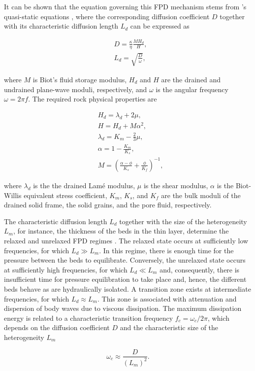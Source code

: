 \documentclass[draft]{agujournal2019}
\begin{document}
It can be shown that the equation governing this FPD mechanism stems from \citeauthor{Biot1941}'s \citeyear{Biot1941} quasi-static equations \cite{Dutta1979, Chandler1981, Norris1993}, where the corresponding diffusion coefficient $D$ together with its characteristic diffusion length $L_d$ can be expressed as \cite{Norris1993}
\begin{linenomath*}
\begin{equation}\label{Eq.3}
\begin{split}
&D= \frac {\kappa} {\eta} \frac{M H_d}{H},\\
&L_d=\sqrt{\frac{D}{\omega}},
\end{split}
\end{equation}
\end{linenomath*}
where $M$ is Biot’s fluid storage modulus, $H_d$ and $H$ are the drained and undrained plane-wave moduli, respectively, and $\omega$ is the angular frequency $\omega = 2 \pi f$.
The required rock physical properties are
\begin{linenomath*}
\begin{equation}\label{Eq.4}
\begin{split}
& H_d = \lambda_d + 2 \mu, \\
& H = H_d + M \alpha ^2, \\
& \lambda_d= K_m - \frac{2}{3} \mu, \\
& \alpha =1-\frac{K_m}{K_s},\\
& M  =\left( \frac{\alpha-\phi}{K_s} +\frac{\phi}{K_f} \right)^{-1},
\end{split}
\end{equation}
\end{linenomath*}
where $\lambda_d$ is the the drained Lamé modulus, $\mu$ is the shear modulus, $\alpha$ is the Biot-Willis equivalent stress coefficient, $K_m$, $K_s$, and $K_f$ are the bulk moduli of the drained solid frame, the solid grains, and the pore fluid, respectively.

The characteristic diffusion length $L_d$ together with the size of the heterogeneity $L_m$, for instance, the thickness of the beds in the thin layer, determine the relaxed and unrelaxed FPD regimes \cite{Muller2010}. The relaxed state occurs at sufficiently low frequencies, for which  $L_d \gg L_m$. In this regime, there is enough time for the pressure between the beds to equilibrate. Conversely, the unrelaxed state occurs at sufficiently high frequencies, for which $L_d \ll L_m$ and, consequently, there is insufficient time for pressure equilibration to take place and, hence, the different beds behave as are hydraulically isolated. A transition zone exists at intermediate frequencies, for which $L_d \approx L_m$.
This zone is associated with attenuation and dispersion of body waves due to viscous dissipation. The maximum dissipation energy is related to a characteristic transition frequency $f_c= \omega_c/2\pi$, which depends on the diffusion coefficient $D$ and the characteristic size of the heterogeneity $L_m$ \cite{Muller2006}
\begin{linenomath*}
\begin{equation}\label{Eq.5}
\omega_c \approx \frac{D}{(L_m)^2}.
\end{equation}
\end{linenomath*}
\end{document}
